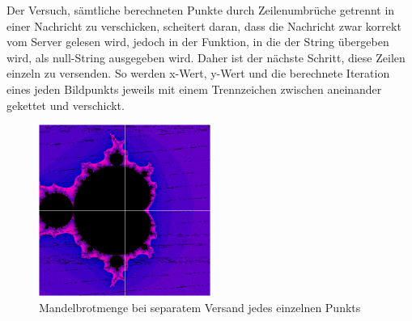\documentclass[12pt, onecolumn, notitlepage]{scrartcl}
\begin{document}
Der Versuch, sämtliche berechneten Punkte durch Zeilenumbrüche getrennt in einer Nachricht zu verschicken, scheitert daran, dass die Nachricht zwar korrekt vom Server gelesen wird, jedoch in der Funktion, in die der String übergeben wird, als null-String ausgegeben wird. Daher ist der nächste Schritt, diese Zeilen einzeln zu versenden. So werden x-Wert, y-Wert und die berechnete Iteration eines jeden Bildpunkts jeweils mit einem Trennzeichen zwischen aneinander gekettet und verschickt. 

\begin{figure}[htbp] 
	\centering
	\includegraphics[width=0.5\textwidth]{zeilenVersandt.PNG}
	\caption{Mandelbrotmenge bei separatem Versand jedes einzelnen Punkts}
	\label{fig:Bild2}
\end{figure}
\end{document}
